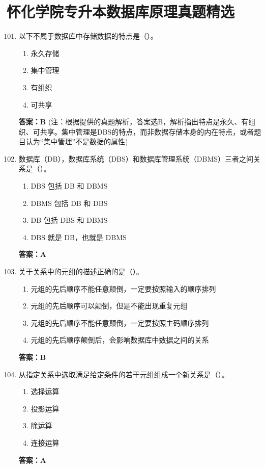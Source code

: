 \documentclass[12pt, a4paper]{article}
\begin{document}
\section{怀化学院专升本数据库原理真题精选}

\begin{enumerate}[label=\arabic*.]
    \setcounter{enumi}{100}
    \item 以下不属于数据库中存储数据的特点是（\quad）。
    \begin{enumerate}
        \item 永久存储
        \item 集中管理
        \item 有组织
        \item 可共享
    \end{enumerate}
    \textbf{答案：B} (注：根据提供的真题解析，答案选B，解析指出特点是永久、有组织、可共享。集中管理是DBS的特点，而非数据存储本身的内在特点，或者题目认为“集中管理”不是数据的属性)

    \item 数据库（DB），数据库系统（DBS）和数据库管理系统（DBMS）三者之间关系是（\quad）。
    \begin{enumerate}
        \item DBS 包括 DB 和 DBMS
        \item DBMS 包括 DB 和 DBS
        \item DB 包括 DBS 和 DBMS
        \item DBS 就是 DB，也就是 DBMS
    \end{enumerate}
    \textbf{答案：A}

    \item 关于关系中的元组的描述正确的是（\quad）。
    \begin{enumerate}
        \item 元组的先后顺序不能任意颠倒，一定要按照输入的顺序排列
        \item 元组的先后顺序可以颠倒，但是不能出现重复元组
        \item 元组的先后顺序不能任意颠倒，一定要按照主码顺序排列
        \item 元组的先后顺序颠倒后，会影响数据库中数据之间的关系
    \end{enumerate}
    \textbf{答案：B}

    \item 从指定关系中选取满足给定条件的若干元组组成一个新关系是（\quad）。
    \begin{enumerate}
        \item 选择运算
        \item 投影运算
        \item 除运算
        \item 连接运算
    \end{enumerate}
    \textbf{答案：A}


\end{enumerate}
\end{document}
